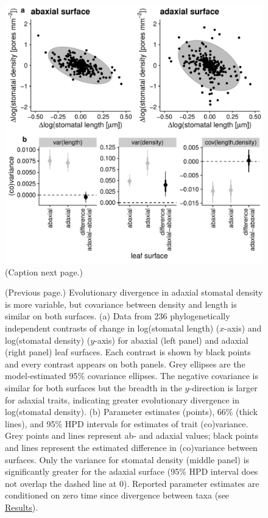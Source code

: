 \documentclass[
  12pt,
]{article}
\begin{document}
\begin{figure}[ht]
\includegraphics[width=\textwidth]{../figures/h1.pdf}
  \caption{(Caption next page.)}
  \label{fig:h1}
\end{figure}
\addtocounter{figure}{-1}

\begin{figure} [t!]
\caption{(Previous page.) Evolutionary divergence in adaxial stomatal density is more variable, but covariance between density and length is similar on both surfaces. (a) Data from 236 phylogenetically independent contrasts of change in log(stomatal length) ($x$-axis) and log(stomatal density) ($y$-axis) for abaxial (left panel) and adaxial (right panel) leaf surfaces. Each contrast is shown by black points and every contrast appears on both panels. Grey ellipses are the model-estimated 95\% covariance ellipses. The negative covariance is similar for both surfaces but the breadth in the $y$-direction is larger for adaxial traits, indicating greater evolutionary divergence in log(stomatal density). (b) Parameter estimates (points), 66\% (thick lines), and 95\% HPD intervals for estimates of trait (co)variance. Grey points and lines represent ab- and adaxial values; black points and lines represent the estimated difference in (co)variance between surfaces. Only the variance for stomatal density (middle panel) is significantly greater for the adaxial surface (95\% HPD interval does not overlap the dashed line at 0). Reported parameter estimates are conditioned on zero time since divergence between taxa (see \protect\hyperlink{results}{Results}).}
\end{figure}
\end{document}
